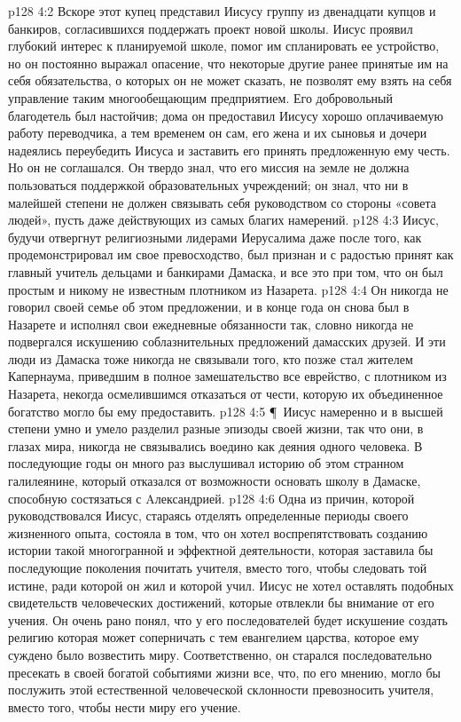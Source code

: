 \vs p128 4:2 Вскоре этот купец представил Иисусу группу из двенадцати купцов и банкиров, согласившихся поддержать проект новой школы. Иисус проявил глубокий интерес к планируемой школе, помог им спланировать ее устройство, но он постоянно выражал опасение, что некоторые другие ранее принятые им на себя обязательства, о которых он не может сказать, не позволят ему взять на себя управление таким многообещающим предприятием. Его добровольный благодетель был настойчив; дома он предоставил Иисусу хорошо оплачиваемую работу переводчика, а тем временем он сам, его жена и их сыновья и дочери надеялись переубедить Иисуса и заставить его принять предложенную ему честь. Но он не соглашался. Он твердо знал, что его миссия на земле не должна пользоваться поддержкой образовательных учреждений; он знал, что ни в малейшей степени не должен связывать себя руководством со стороны «совета людей», пусть даже действующих из самых благих намерений.
\vs p128 4:3 Иисус, будучи отвергнут религиозными лидерами Иерусалима даже после того, как продемонстрировал им свое превосходство, был признан и с радостью принят как главный учитель дельцами и банкирами Дамаска, и все это при том, что он был простым и никому не известным плотником из Назарета.
\vs p128 4:4 Он никогда не говорил своей семье об этом предложении, и в конце года он снова был в Назарете и исполнял свои ежедневные обязанности так, словно никогда не подвергался искушению соблазнительных предложений дамасских друзей. И эти люди из Дамаска тоже никогда не связывали того, кто позже стал жителем Капернаума, приведшим в полное замешательство все еврейство, с плотником из Назарета, некогда осмелившимся отказаться от чести, которую их объединенное богатство могло бы ему предоставить.
\vs p128 4:5 \P\ Иисус намеренно и в высшей степени умно и умело разделил разные эпизоды своей жизни, так что они, в глазах мира, никогда не связывались воедино как деяния одного человека. В последующие годы он много раз выслушивал историю об этом странном галилеянине, который отказался от возможности основать школу в Дамаске, способную состязаться с Aлександрией.
\vs p128 4:6 Одна из причин, которой руководствовался Иисус, стараясь отделять определенные периоды своего жизненного опыта, состояла в том, что он хотел воспрепятствовать созданию истории такой многогранной и эффектной деятельности, которая заставила бы последующие поколения почитать учителя, вместо того, чтобы следовать той истине, ради которой он жил и которой учил. Иисус не хотел оставлять подобных свидетельств человеческих достижений, которые отвлекли бы внимание от его учения. Он очень рано понял, что у его последователей будет искушение создать религию  которая может соперничать с тем евангелием царства, которое ему суждено было возвестить миру. Соответственно, он старался последовательно пресекать в своей богатой событиями жизни все, что, по его мнению, могло бы послужить этой естественной человеческой склонности превозносить учителя, вместо того, чтобы нести миру его учение.
